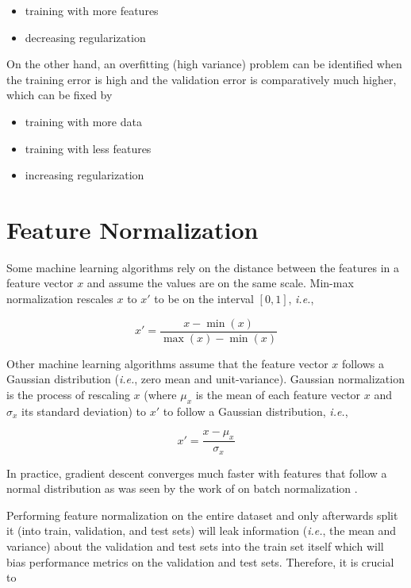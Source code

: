 \begin{itemize}
    \item training with more features
    \item decreasing regularization
\end{itemize}

On the other hand, an overfitting (high variance) problem can be identified when the training error is high and the validation error is comparatively much higher, which can be fixed by

\begin{itemize}
    \item training with more data
    \item training with less features
    \item increasing regularization
\end{itemize}

\section{Feature Normalization}

Some machine learning algorithms rely on the distance between the features in a feature vector $x$ and assume the values are on the same scale. Min-max normalization rescales $x$ to $x'$ to be on the interval $[0, 1]$, \textit{i.e.},

\begin{equation}
x' = \frac{x - \min{(x)}}{\max{(x)} - \min{(x)}}
\end{equation}

Other machine learning algorithms assume that the feature vector $x$ follows a Gaussian distribution (\textit{i.e.}, zero mean and unit-variance). Gaussian normalization is the process of rescaling $x$ (where $\mu_x$ is the mean of each feature vector $x$ and $\sigma_x$ its standard deviation) to $x'$ to follow a Gaussian distribution, \textit{i.e.},

\begin{equation}
x' = \frac{x - \mu_x}{\sigma_x}
\end{equation}

In practice, gradient descent converges much faster with features that follow a normal distribution as was seen by the work of \citeauthor{batchnormalization} on batch normalization \cite{batchnormalization}.

Performing feature normalization on the entire dataset and only afterwards split it (into train, validation, and test sets) will leak information (\textit{i.e.}, the mean and variance) about the validation and test sets into the train set itself which will bias performance metrics on the validation and test sets. Therefore, it is crucial to

